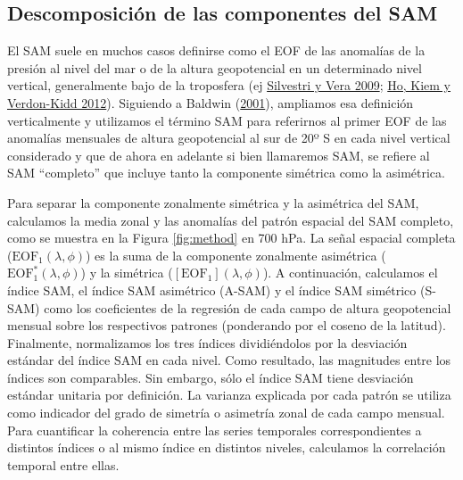 \documentclass[12pt,oneside,a4paper]{reedthesis}
\begin{document}
\hypertarget{definition-of-indices}{%
\subsection{Descomposición de las componentes del SAM}\label{definition-of-indices}}

El SAM suele en muchos casos definirse como el EOF de las anomalías de la presión al nivel del mar o de la altura geopotencial en un determinado nivel vertical, generalmente bajo de la troposfera (ej \protect\hyperlink{ref-silvestri2009}{Silvestri y Vera 2009}; \protect\hyperlink{ref-ho2012}{Ho, Kiem y Verdon-Kidd 2012}).
Siguiendo a Baldwin (\protect\hyperlink{ref-baldwin2001}{2001}), ampliamos esa definición verticalmente y utilizamos el término SAM para referirnos al primer EOF de las anomalías mensuales de altura geopotencial al sur de 20º S en cada nivel vertical considerado y que de ahora en adelante si bien llamaremos SAM, se refiere al SAM ``completo'' que incluye tanto la componente simétrica como la asimétrica.

Para separar la componente zonalmente simétrica y la asimétrica del SAM, calculamos la media zonal y las anomalías del patrón espacial del SAM completo, como se muestra en la Figura \ref{fig:method} en 700 hPa.
La señal espacial completa (\(\mathrm{EOF_1}(\lambda, \phi)\)) es la suma de la componente zonalmente asimétrica (\(\mathrm{EOF_1^*}(\lambda, \phi)\)) y la simétrica (\([\mathrm{EOF_1}](\lambda, \phi)\)).
A continuación, calculamos el índice SAM, el índice SAM asimétrico (A-SAM) y el índice SAM simétrico (S-SAM) como los coeficientes de la regresión de cada campo de altura geopotencial mensual sobre los respectivos patrones (ponderando por el coseno de la latitud).
Finalmente, normalizamos los tres índices dividiéndolos por la desviación estándar del índice SAM en cada nivel.
Como resultado, las magnitudes entre los índices son comparables.
Sin embargo, sólo el índice SAM tiene desviación estándar unitaria por definición.
La varianza explicada por cada patrón se utiliza como indicador del grado de simetría o asimetría zonal de cada campo mensual.
Para cuantificar la coherencia entre las series temporales correspondientes a distintos índices o al mismo índice en distintos niveles, calculamos la correlación temporal entre ellas.
\end{document}
